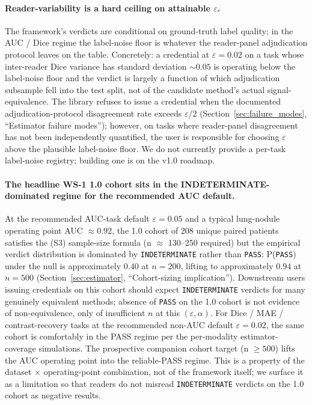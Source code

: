 \documentclass[twoside,11pt]{article}
\begin{document}
\paragraph{Reader-variability is a hard ceiling on attainable $\varepsilon$.} The framework's verdicts are conditional on ground-truth label quality; in the AUC / Dice regime the label-noise floor is whatever the reader-panel adjudication protocol leaves on the table. Concretely: a credential at $\varepsilon = 0.02$ on a task whose inter-reader Dice variance has standard deviation $\sim 0.05$ is operating below the label-noise floor and the verdict is largely a function of which adjudication subsample fell into the test split, not of the candidate method's actual signal-equivalence. The library refuses to issue a credential when the documented adjudication-protocol disagreement rate exceeds $\varepsilon / 2$ (Section~\ref{sec:failure_modes}, ``Estimator failure modes''); however, on tasks where reader-panel disagreement has not been independently quantified, the user is responsible for choosing $\varepsilon$ above the plausible label-noise floor. We do not currently provide a per-task label-noise registry; building one is on the v1.0 roadmap.

\paragraph{The headline WS-1 1.0 cohort sits in the INDETERMINATE-dominated regime for the recommended AUC default.} At the recommended AUC-task default $\varepsilon = 0.05$ and a typical lung-nodule operating point AUC $\approx 0.92$, the 1.0 cohort of 208 unique paired patients satisfies the (S3) sample-size formula (n $\approx$ 130--250 required) but the empirical verdict distribution is dominated by \texttt{INDETERMINATE} rather than \texttt{PASS}: P(\texttt{PASS}) under the null is approximately $0.40$ at $n = 200$, lifting to approximately $0.94$ at $n = 500$ (Section~\ref{sec:estimator}, ``Cohort-sizing implication''). Downstream users issuing credentials on this cohort should expect \texttt{INDETERMINATE} verdicts for many genuinely equivalent methods; absence of \texttt{PASS} on the 1.0 cohort is not evidence of non-equivalence, only of insufficient $n$ at this $(\varepsilon, \alpha)$. For Dice / MAE / contrast-recovery tasks at the recommended non-AUC default $\varepsilon = 0.02$, the same cohort is comfortably in the PASS regime per the per-modality estimator-coverage simulations. The prospective companion cohort target (n $\geq 500$) lifts the AUC operating point into the reliable-PASS regime. This is a property of the dataset $\times$ operating-point combination, not of the framework itself; we surface it as a limitation so that readers do not misread \texttt{INDETERMINATE} verdicts on the 1.0 cohort as negative results.
\end{document}

